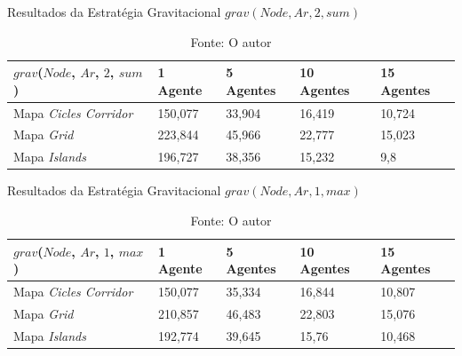 \begin{table}
	\centering
	\caption{Resultados da Estratégia Gravitacional $grav(Node,Ar,2,sum)$}
	\label{result_grav1}
	\begin{tabularx}{\linewidth}{|X|X|X|X|X|}
		\hline
		\textbf{$grav$($Node$, $Ar$, $2$, $sum$)} & \textbf{1 Agente} & \textbf{5 Agentes} & \textbf{10 Agentes} & \textbf{15 Agentes} \\
		\hline
		Mapa \textit{Cicles Corridor} & 150,077 & 33,904 & 16,419 & 10,724 \\
		\hline
		Mapa \textit{Grid} & 223,844 & 45,966 & 22,777 & 15,023 \\
		\hline
		Mapa \textit{Islands} & 196,727 & 38,356 & 15,232 & 9,8 \\
		\hline
	\end{tabularx}
	\caption*{Fonte: O autor}
\end{table}

\begin{table}
	\centering
	\caption{Resultados da Estratégia Gravitacional $grav(Node,Ar,1,max)$}
	\label{result_grav2}
	\begin{tabularx}{\linewidth}{|X|X|X|X|X|}
		\hline
		\textbf{$grav$($Node$, $Ar$, $1$, $max$)} & \textbf{1 Agente} & \textbf{5 Agentes} & \textbf{10 Agentes} & \textbf{15 Agentes} \\
		\hline
		Mapa \textit{Cicles Corridor} & 150,077 & 35,334 & 16,844 & 10,807 \\
		\hline
		Mapa \textit{Grid} & 210,857 & 46,483 & 22,803 & 15,076 \\
		\hline
		Mapa \textit{Islands} & 192,774 & 39,645 & 15,76 & 10,468 \\
		\hline
	\end{tabularx}
	\caption*{Fonte: O autor}
\end{table}

